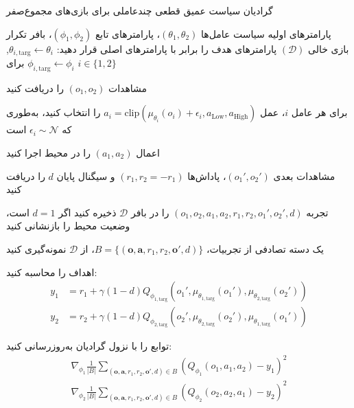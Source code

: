 \begin{algorithm}[H]
    \caption{گرادیان سیاست عمیق قطعی چند­عاملی برای بازی‌های مجموع­‌صفر}\label{alg:MADDPG}
    \begin{algorithmic}[1]
         پارامترهای اولیه سیاست عامل‌ها $(\theta_1, \theta_2)$، پارامترهای تابع  $(\phi_1, \phi_2)$، بافر تکرار بازی خالی $(\mathcal{D})$
        \State پارامترهای هدف را برابر با پارامترهای اصلی قرار دهید: $\theta_{i,\text{targ}} \leftarrow \theta_i$, $\phi_{i,\text{targ}} \leftarrow \phi_i$ برای $i \in \{1, 2\}$
        
            \State \parbox[t]{\dimexpr\linewidth-\algorithmicindent}{
            مشاهدات $(o_1, o_2)$ را دریافت کنید
            \strut}
            \State \parbox[t]{\dimexpr\linewidth-\algorithmicindent}{
            برای هر عامل $i$، عمل $a_i = \text{clip}(\mu_{\theta_i}(o_i) + \epsilon_i, a_{\text{Low}}, a_{\text{High}})$ را انتخاب کنید، به‌طوری که $\epsilon_i \sim \mathcal{N}$ است
            \strut}
            \State اعمال $(a_1, a_2)$ را در محیط اجرا کنید
            \State \parbox[t]{\dimexpr\linewidth-\algorithmicindent}{
            مشاهدات بعدی $(o_1', o_2')$، پاداش‌ها $(r_1, r_2=-r_1)$ و سیگنال پایان $d$ را دریافت کنید
            \strut}
            \State تجربه $(o_1, o_2, a_1, a_2, r_1, r_2, o_1', o_2', d)$ را در بافر $\mathcal{D}$ ذخیره کنید
            \State اگر $d=1$ است، وضعیت محیط را بازنشانی کنید
            
                    \State یک دسته تصادفی از تجربیات، $B = \{(\boldsymbol{o}, \boldsymbol{a}, r_1, r_2, \boldsymbol{o}', d)\}$، از $\mathcal{D}$ نمونه‌گیری کنید
                    \State \parbox[t]{\dimexpr\linewidth-\algorithmicindent}{
                    اهداف را محاسبه کنید:
                    \begin{align*}
                        y_1 &= r_1 + \gamma (1-d) Q_{\phi_{1,\text{targ}}}(o_1', \mu_{\theta_{1,\text{targ}}}(o_1'), \mu_{\theta_{2,\text{targ}}}(o_2')) \\
                        y_2 &= r_2 + \gamma (1-d) Q_{\phi_{2,\text{targ}}}(o_2', \mu_{\theta_{2,\text{targ}}}(o_2'), \mu_{\theta_{1,\text{targ}}}(o_1'))
                    \end{align*}
                    \strut}
                    \State \parbox[t]{\dimexpr\linewidth-\algorithmicindent}{
                    توابع  را با نزول گرادیان به‌روزرسانی کنید:
                    \begin{align*}
                        \nabla_{\phi_1} \frac{1}{|B|}\sum_{(\boldsymbol{o}, \boldsymbol{a}, r_1, r_2, \boldsymbol{o}', d) \in B} \left( Q_{\phi_1}(o_1, a_1, a_2) - y_1 \right)^2 \\
                        \nabla_{\phi_2} \frac{1}{|B|}\sum_{(\boldsymbol{o}, \boldsymbol{a}, r_1, r_2, \boldsymbol{o}', d) \in B} \left( Q_{\phi_2}(o_2, a_2, a_1) - y_2 \right)^2
                    \end{align*}
                    \strut}
                    

\end{algorithmic}
\end{algorithm}
